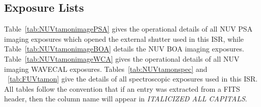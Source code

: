 \clearpage
\subsection{Exposure Lists}\label{subsec:elists}

Table~\ref{tab:NUVtamonimagePSA} gives the operational details of all NUV PSA imaging exposures which opened the
external shutter used in this ISR, while Table~\ref{tab:NUVtamonimageBOA} details the NUV BOA imaging exposures.
Table~\ref{tab:NUVtamonimageWCA} gives the operational details of all NUV imaging WAVECAL exposures.
Tables~\ref{tab:NUVtamonspec} and ~\ref{tab:FUVtamon} give the details of all spectroscopic exposures used in this ISR.
All tables follow the convention that if an entry was extracted from a FITS header, then the column name will appear in \textit{ITALICIZED ALL CAPITALS}.\\

